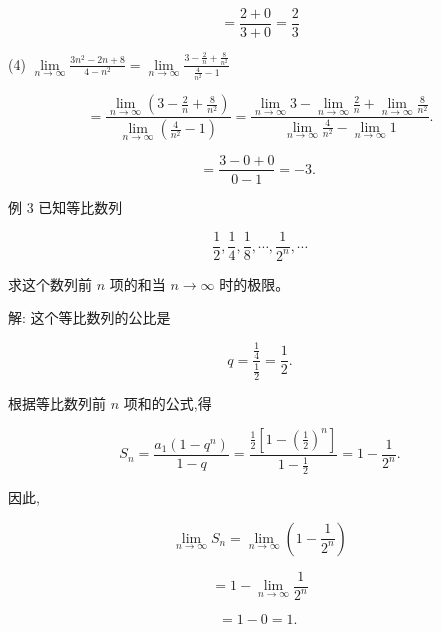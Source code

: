 \documentclass[lang=cn,newtx,12pt,scheme=chinese]{elegantbook}
\begin{document}
\[
= \frac{2 + 0}{3 + 0} = \frac{2}{3}
\]

(4) \(\mathop{\lim }\limits_{{n \rightarrow \infty }}\frac{3{n}^{2} - {2n} + 8}{4 - {n}^{2}} = \mathop{\lim }\limits_{{n \rightarrow \infty }}\frac{3 - \frac{2}{n} + \frac{8}{{n}^{2}}}{\frac{4}{{n}^{2}} - 1}\)

\[
= \frac{\mathop{\lim }\limits_{{n \rightarrow \infty }}\left( {3 - \frac{2}{n} + \frac{8}{{n}^{2}}}\right) }{\mathop{\lim }\limits_{{n \rightarrow \infty }}\left( {\frac{4}{{n}^{2}} - 1}\right) } = \frac{\mathop{\lim }\limits_{{n \rightarrow \infty }}3 - \mathop{\lim }\limits_{{n \rightarrow \infty }}\frac{2}{n} + \mathop{\lim }\limits_{{n \rightarrow \infty }}\frac{8}{{n}^{2}}}{\mathop{\lim }\limits_{{n \rightarrow \infty }}\frac{4}{{n}^{2}} - \mathop{\lim }\limits_{{n \rightarrow \infty }}1}.
\]

\[
= \frac{3 - 0 + 0}{0 - 1} = - 3\text{. }
\]

例 3 已知等比数列

\[
\frac{1}{2},\frac{1}{4},\frac{1}{8},\cdots ,\frac{1}{{2}^{n}},\cdots
\]

求这个数列前 \(n\) 项的和当 \(n \rightarrow \infty\) 时的极限。

解: 这个等比数列的公比是

\[
q = \frac{\frac{1}{4}}{\frac{1}{2}} = \frac{1}{2}.
\]

根据等比数列前 \(n\) 项和的公式,得

\[
{S}_{n} = \frac{{a}_{1}\left( {1 - {q}^{n}}\right) }{1 - q} = \frac{\frac{1}{2}\left\lbrack {1 - {\left( \frac{1}{2}\right) }^{n}}\right\rbrack }{1 - \frac{1}{2}} = 1 - \frac{1}{{2}^{n}}.
\]

因此,

\[
\mathop{\lim }\limits_{{n \rightarrow \infty }}{S}_{n} = \mathop{\lim }\limits_{{n \rightarrow \infty }}\left( {1 - \frac{1}{{2}^{n}}}\right)
\]

\[
= 1 - \mathop{\lim }\limits_{{n \rightarrow \infty }}\frac{1}{{2}^{n}}
\]

\[
= 1 - 0 = 1\text{. }
\]
\end{document}
